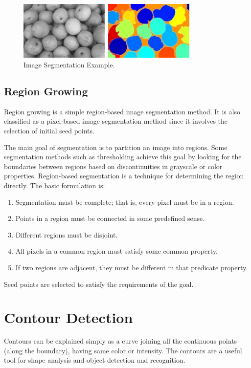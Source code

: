 \begin{figure}[h]
  \centering
  \includegraphics[width=0.8\textwidth]{figures/segmentation}
  \caption{Image Segmentation Example.}
  \label{fig:segmentation}
\end{figure}

\subsection{Region Growing}

Region growing is a simple region-based image segmentation method. It is also classified as a pixel-based image segmentation method since it involves the selection of initial seed points.

The main goal of segmentation is to partition an image into regions. Some segmentation methods such as thresholding achieve this goal by looking for the boundaries between regions based on discontinuities in grayscale or color properties. Region-based segmentation is a technique for determining the region directly. The basic formulation is:

\begin{enumerate}
\item Segmentation must be complete; that is, every pixel must be in a region.
\item Points in a region must be connected in some predefined sense.
\item Different regions must be disjoint.
\item All pixels in a common region must satisfy some common property.
\item If two regions are adjacent, they must be different in that predicate property.
\end{enumerate}

Seed points are selected to satisfy the requirements of the goal.

\section{Contour Detection}
Contours can be explained simply as a curve joining all the continuous points (along the boundary), having same color
or intensity. The contours are a useful tool for shape analysis and object detection and recognition.


